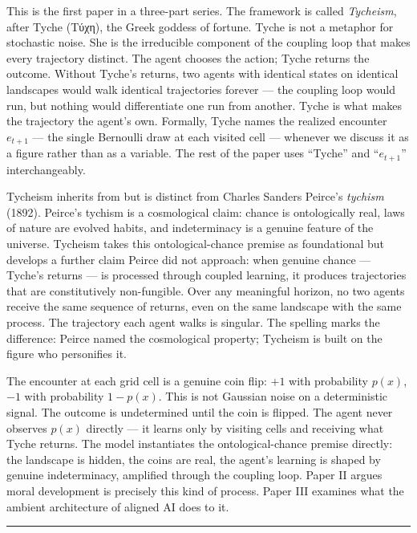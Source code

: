 \documentclass[
]{article}
\begin{document}
This is the first paper in a three-part series. The framework is called
\emph{Tycheism}, after Tyche (Τύχη), the Greek goddess of fortune. Tyche
is not a metaphor for stochastic noise. She is the irreducible component
of the coupling loop that makes every trajectory distinct. The agent
chooses the action; Tyche returns the outcome. Without Tyche's returns,
two agents with identical states on identical landscapes would walk
identical trajectories forever --- the coupling loop would run, but
nothing would differentiate one run from another. Tyche is what makes
the trajectory the agent's own. Formally, Tyche names the realized
encounter \(e_{t+1}\) --- the single Bernoulli draw at each visited cell
--- whenever we discuss it as a figure rather than as a variable. The
rest of the paper uses ``Tyche'' and ``\(e_{t+1}\)'' interchangeably.

Tycheism inherits from but is distinct from Charles Sanders Peirce's
\emph{tychism} (1892). Peirce's tychism is a cosmological claim: chance
is ontologically real, laws of nature are evolved habits, and
indeterminacy is a genuine feature of the universe. Tycheism takes this
ontological-chance premise as foundational but develops a further claim
Peirce did not approach: when genuine chance --- Tyche's returns --- is
processed through coupled learning, it produces trajectories that are
constitutively non-fungible. Over any meaningful horizon, no two agents
receive the same sequence of returns, even on the same landscape with
the same process. The trajectory each agent walks is singular. The
spelling marks the difference: Peirce named the cosmological property;
Tycheism is built on the figure who personifies it.

The encounter at each grid cell is a genuine coin flip: \(+1\) with
probability \(p(x)\), \(-1\) with probability \(1 - p(x)\). This is not
Gaussian noise on a deterministic signal. The outcome is undetermined
until the coin is flipped. The agent never observes \(p(x)\) directly
--- it learns only by visiting cells and receiving what Tyche returns.
The model instantiates the ontological-chance premise directly: the
landscape is hidden, the coins are real, the agent's learning is shaped
by genuine indeterminacy, amplified through the coupling loop. Paper II
argues moral development is precisely this kind of process. Paper III
examines what the ambient architecture of aligned AI does to it.

\begin{center}\rule{0.5\linewidth}{0.5pt}\end{center}
\end{document}
